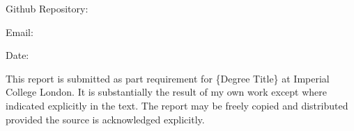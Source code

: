 \begin{titlepage}
\noindent Github Repository: 
\vspace{0.2cm}

\noindent Email:
\vspace{0.2cm}

\noindent Date: \@date 

\vfill %

\begin{center}
This report is submitted as part requirement for \{Degree Title\} at Imperial College London. It is substantially the result of my own work except where indicated explicitly in the text.  The report may be freely copied and distributed provided the source is acknowledged explicitly.
\end{center}

\makeatother


\end{titlepage}

